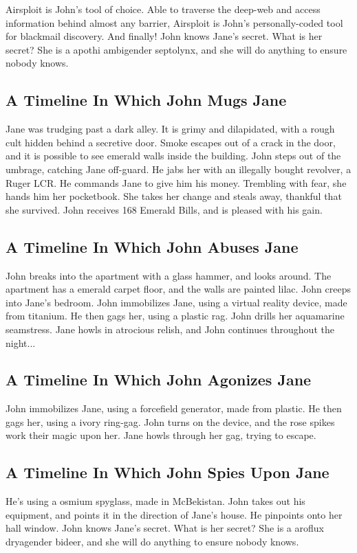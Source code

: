 \documentclass{article}
\begin{document}
Airsploit is John's tool of choice. Able to traverse the deep{-}web and access information behind almost any barrier, Airsploit is John's personally{-}coded tool for blackmail discovery.
And finally!
John knows Jane's secret. What is her secret? She is a apothi ambigender septolynx, and she will do anything to ensure nobody knows.
\subsection{A Timeline In Which John Mugs Jane}


Jane was trudging past a dark alley.
It is grimy and dilapidated, with a rough cult hidden behind a secretive door.
Smoke escapes out of a crack in the door, and it is possible to see emerald walls inside the building.
John steps out of the umbrage, catching Jane off{-}guard.
He jabs her with an illegally bought revolver, a Ruger LCR.
He commands Jane to give him his money.
Trembling with fear, she hands him her pocketbook.
She takes her change and steals away, thankful that she survived.
John receives 168 Emerald Bills, and is pleased with his gain.
\subsection{A Timeline In Which John Abuses Jane}


John breaks into the apartment with a glass hammer, and looks around.
The apartment has a emerald carpet floor, and the walls are painted lilac.
John creeps into Jane's bedroom.
John immobilizes Jane, using a virtual reality device, made from titanium.
He then gags her, using a plastic rag.
John drills her aquamarine seamstress.
Jane howls in atrocious relish, and John continues throughout the night...
\subsection{A Timeline In Which John Agonizes Jane}


John immobilizes Jane, using a forcefield generator, made from plastic.
He then gags her, using a ivory ring{-}gag.
John turns on the device, and the rose spikes work their magic upon her.
Jane howls through her gag, trying to escape.
\subsection{A Timeline In Which John Spies Upon Jane}


He's using a osmium spyglass, made in McBekistan.
John takes out his equipment, and points it in the direction of Jane's house. He pinpoints onto her hall window.
John knows Jane's secret. What is her secret? She is a aroflux dryagender bideer, and she will do anything to ensure nobody knows.
\end{document}
